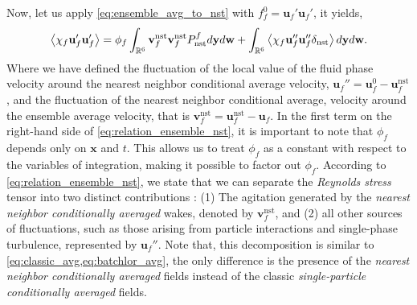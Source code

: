 Now, let us apply \ref{eq:ensemble_avg_to_nst} with $f_f^0 = \textbf{u}_f'\textbf{u}_f'$, it yields,
\begin{equation}
    \avg{\chi_f \textbf{u}_f'\textbf{u}_f'}
    = 
    \phi_f
    \int_{\mathbb{R}^6}
    \textbf{v}_f^\text{nst}
    \textbf{v}_f^\text{nst}
    P_\text{nst}^f
    d\textbf{y}
    d\textbf{w}
    + 
    \int_{\mathbb{R}^6}
    \avg{
        \chi_f
        \textbf{u}_f''
        \textbf{u}_f''
        \delta_\text{nst}
    }
    d\textbf{y}
    d\textbf{w}.
    \label{eq:relation_ensemble_nst}
\end{equation}
Where we have defined 
the fluctuation of the local value of the fluid phase velocity around the nearest neighbor conditional average velocity, $\textbf{u}_f'' = \textbf{u}_f^0 - \textbf{u}_f^\text{nst}$, and the fluctuation of the nearest neighbor conditional average, velocity around the ensemble average velocity, that is $\textbf{v}_f^\text{nst} = \textbf{u}_f^\text{nst} - \textbf{u}_f$. 
In the first term on the right-hand side of \ref{eq:relation_ensemble_nst}, it is important to note that $\phi_f$ depends only on $\textbf{x}$ and $t$. 
This allows us to treat $\phi_f$ as a constant with respect to the variables of integration, making it possible to factor out $\phi_f$.
According to \ref{eq:relation_ensemble_nst}, 
we state that we can separate the \textit{Reynolds stress} tensor into two distinct contributions :  (1) The agitation generated by the \textit{nearest neighbor conditionally averaged} wakes, denoted by $\textbf{v}_f^\text{nst}$, and (2) all other sources of fluctuations, such as those arising from particle interactions and single-phase turbulence, represented by $\textbf{u}_f''$. 
Note that, this decomposition is similar to \ref{eq:classic_avg,eq:batchlor_avg}, the only difference is the presence of the \textit{nearest neighbor conditionally averaged} fields instead of the classic \textit{single-particle conditionally averaged} fields. 


